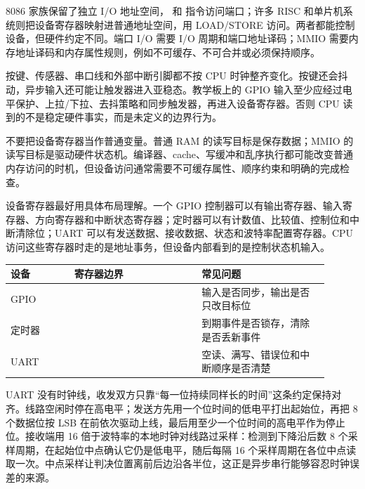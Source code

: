 8086 家族保留了独立 I/O 地址空间， 和  指令访问端口；许多 RISC 和单片机系统则把设备寄存器映射进普通地址空间，用 LOAD/STORE 访问。两者都能控制设备，但硬件约定不同。端口 I/O 需要 I/O 周期和端口地址译码；MMIO 需要内存地址译码和内存属性规则，例如不可缓存、不可合并或必须保持顺序。

按键、传感器、串口线和外部中断引脚都不按 CPU 时钟整齐变化。按键还会抖动，异步输入还可能让触发器进入亚稳态。教学板上的 GPIO 输入至少应经过电平保护、上拉/下拉、去抖策略和同步触发器，再进入设备寄存器。否则 CPU 读到的不是稳定硬件事实，而是未定义的边界行为。

\begin{warningbox}
不要把设备寄存器当作普通变量。普通 RAM 的读写目标是保存数据；MMIO 的读写目标是驱动硬件状态机。编译器、cache、写缓冲和乱序执行都可能改变普通内存访问的时机，但设备访问通常需要不可缓存属性、顺序约束和明确的完成检查。
\end{warningbox}

设备寄存器最好用具体布局理解。一个 GPIO 控制器可以有输出寄存器、输入寄存器、方向寄存器和中断状态寄存器；定时器可以有计数值、比较值、控制位和中断清除位；UART 可以有发送数据、接收数据、状态和波特率配置寄存器。CPU 访问这些寄存器时走的是地址事务，但设备内部看到的是控制状态机输入。

\begin{longtable}{L{0.18\linewidth}L{0.36\linewidth}L{0.36\linewidth}}
\toprule
设备 & 寄存器边界 & 常见问题 \\
\midrule
GPIO &  & 输入是否同步，输出是否只改目标位 \\
定时器 &  & 到期事件是否锁存，清除是否丢新事件 \\
UART &  & 空读、满写、错误位和中断顺序是否清楚 \\
\bottomrule
\end{longtable}

UART 没有时钟线，收发双方只靠“每一位持续同样长的时间”这条约定保持对齐。线路空闲时停在高电平；发送方先用一个位时间的低电平打出起始位，再把 8 个数据位按 LSB 在前依次驱动上线，最后用至少一个位时间的高电平作为停止位。接收端用 16 倍于波特率的本地时钟对线路过采样：检测到下降沿后数 8 个采样周期，在起始位中点确认它仍是低电平，随后每隔 16 个采样周期在各位中点读取一次。中点采样让判决位置离前后边沿各半位，这正是异步串行能够容忍时钟误差的来源。

